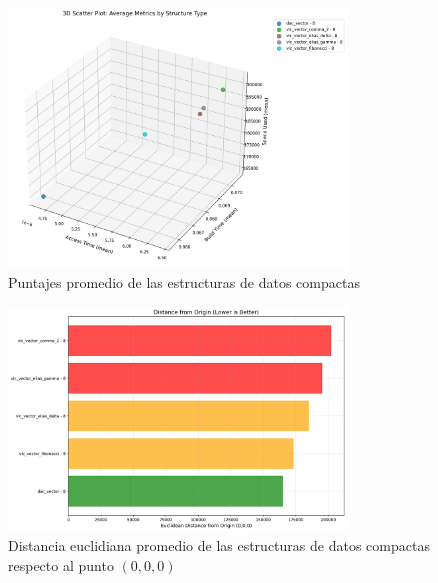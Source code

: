\begin{figure}[H]
\centering
\includegraphics[width=0.8\textwidth]{alternatives/scatter_plot/3d_scatter_plot_structures.png}
\caption[Comparación Estructuras De Datos Compactas]{Puntajes promedio de las estructuras de datos compactas}   
\label{fig:scatter_plot_structures}
\end{figure}

\begin{figure}[H]
\centering
\includegraphics[width=0.8\textwidth]{alternatives/scatter_plot/euclidean_distance_from_ideal.png}
\caption[Distancia Euclidiana Estructuras De Datos]{Distancia euclidiana promedio de las estructuras de datos compactas respecto al punto $(0, 0, 0)$}   
\label{fig:euclidian_distance_from_ideal}
\end{figure}

